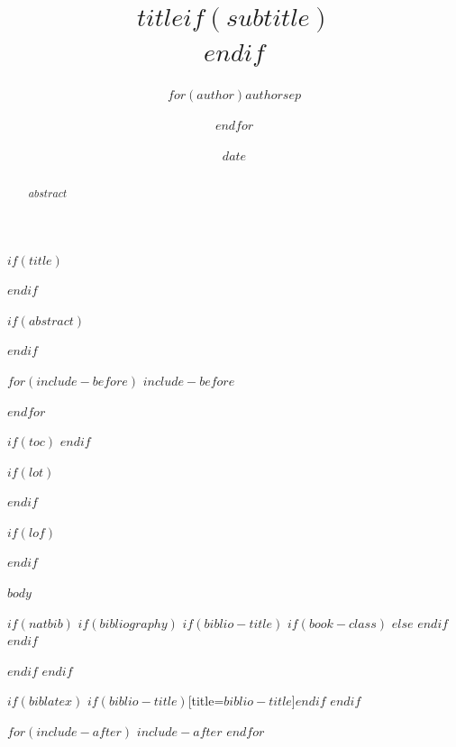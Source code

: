 \documentclass[$if(fontsize)$$fontsize$,$endif$$if(lang)$$lang$,$endif$$if(papersize)$$papersize$,$endif$$for(classoption)$$classoption$$sep$,$endfor$]{$documentclass$}
\title{$title$$if(subtitle)$\\\vspace{0.5em}{\large $subtitle$}$endif$}
\author{$for(author)$$author$$sep$ \and $endfor$}
\date{$date$}
\begin{document}
$if(title)$
\maketitle
$endif$

$if(abstract)$
\begin{abstract}
$abstract$
\end{abstract}
$endif$

$for(include-before)$
$include-before$

$endfor$

$if(toc)$
{
\hypersetup{hidelinks}
\setcounter{tocdepth}{$toc-depth$}
\tableofcontents
}
$endif$

$if(lot)$
\listoftables
$endif$

$if(lof)$
\listoffigures
$endif$

$body$

$if(natbib)$
$if(bibliography)$
$if(biblio-title)$
$if(book-class)$
\renewcommand\bibname{$biblio-title$}
$else$
\renewcommand\refname{$biblio-title$}
$endif$
$endif$

$endif$
$endif$

$if(biblatex)$
\printbibliography$if(biblio-title)$[title=$biblio-title$]$endif$
$endif$

$for(include-after)$
$include-after$
$endfor$
\end{document}
